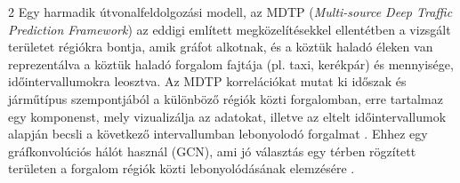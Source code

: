 \documentclass{article}
\begin{document}
\begin{multicols}{2}
Egy harmadik útvonalfeldolgozási modell, az MDTP (\textit{Multi-source Deep Traffic Prediction Framework}) \cite{fang2021mdtp} az eddigi említett
megközelítésekkel ellentétben a vizsgált területet régiókra bontja, amik gráfot alkotnak, és a köztük haladó éleken van reprezentálva
a köztük haladó forgalom fajtája (pl. taxi, kerékpár) és mennyisége, időintervallumokra leosztva. Az MDTP korrelációkat mutat ki időszak
és járműtípus szempontjából a különböző régiók közti forgalomban, erre tartalmaz egy komponenst, mely vizualizálja az adatokat,
illetve az eltelt időintervallumok alapján becsli a következő intervallumban lebonyolodó forgalmat \cite{fang2021mdtp}. Ehhez egy gráfkonvolúciós hálót
használ (GCN), ami jó választás egy térben rögzített területen a forgalom régiók közti lebonyolódásának elemzésére \cite{fang2021mdtp}.

\end{multicols}
\end{document}
